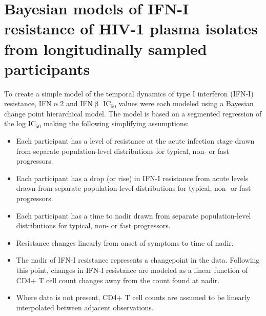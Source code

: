 \documentclass[12pt]{article}
\newcommand{\ifna}{IFN\hspace{-.08em}${\upalpha 2}$}
\newcommand{\ifnb}{IFN\hspace{-.03em}${\upbeta}$}
\newcommand{\icFifty}{IC$_{50}$}
\begin{document}
\begin{center}
 \Large\textbf{}
\end{center}
\section*{Bayesian models of IFN-I resistance of HIV-1 plasma isolates from longitudinally sampled participants}
To create a simple model of the temporal dynamics of type I interferon (IFN-I) resistance, \ifna{} and \ifnb{} \icFifty{} values were each modeled using a Bayesian change point hierarchical model.
  The model is based on a segmented regression of the log \icFifty{} making the following simplifying assumptions:
    \begin{itemize}
          \item Each participant has a level of resistance at the acute infection stage drawn from separate population-level distributions for typical, non- or fast progressors.
          \item Each participant has a drop (or rise) in IFN-I resistance from acute levels drawn from separate population-level distributions for typical, non- or fast progressors.
          \item Each participant has a time to nadir drawn from separate population-level distributions for typical, non- or fast progressors.
          \item Resistance changes linearly from onset of symptoms to time of nadir.
          \item The nadir of IFN-I resistance represents a changepoint in the data. Following this point, changes in IFN-I resistance are modeled as a linear function of CD4+ T cell count changes away from the count found at nadir.
          \item Where data is not present, CD4+ T cell counts are assumed to be linearly interpolated between adjacent observations.
    \end{itemize}
  
\end{document}
